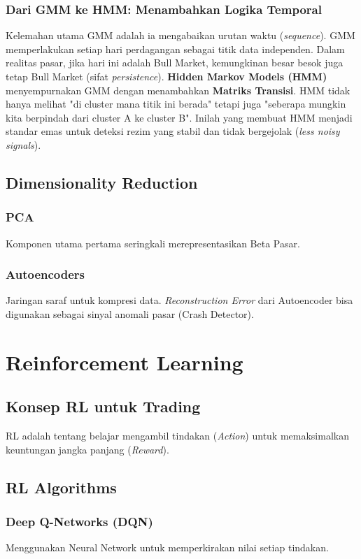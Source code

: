 \documentclass[12pt,a4paper]{book}
\begin{document}
\subsection{Dari GMM ke HMM: Menambahkan Logika Temporal}
Kelemahan utama GMM adalah ia mengabaikan urutan waktu (\textit{sequence}). GMM memperlakukan setiap hari perdagangan sebagai titik data independen. Dalam realitas pasar, jika hari ini adalah Bull Market, kemungkinan besar besok juga tetap Bull Market (sifat \textit{persistence}).
\textbf{Hidden Markov Models (HMM)} menyempurnakan GMM dengan menambahkan \textbf{Matriks Transisi}. HMM tidak hanya melihat "di cluster mana titik ini berada" tetapi juga "seberapa mungkin kita berpindah dari cluster A ke cluster B". Inilah yang membuat HMM menjadi standar emas untuk deteksi rezim yang stabil dan tidak bergejolak (\textit{less noisy signals}).

\section{Dimensionality Reduction}
\subsection{PCA}
Komponen utama pertama seringkali merepresentasikan Beta Pasar.
\subsection{Autoencoders}
Jaringan saraf untuk kompresi data. \textit{Reconstruction Error} dari Autoencoder bisa digunakan sebagai sinyal anomali pasar (Crash Detector).

\chapter{Reinforcement Learning}
\section{Konsep RL untuk Trading}
RL adalah tentang belajar mengambil tindakan (\textit{Action}) untuk memaksimalkan keuntungan jangka panjang (\textit{Reward}).

\section{RL Algorithms}
\subsection{Deep Q-Networks (DQN)}
Menggunakan Neural Network untuk memperkirakan nilai setiap tindakan.
\end{document}
